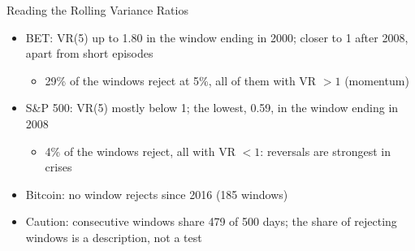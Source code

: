 \begin{frame}{Reading the Rolling Variance Ratios}
\itemsize{\small}
\begin{itemize}
    \item BET: VR(5) up to 1.80 in the window ending in 2000; closer to 1 after 2008, apart from short episodes
    \begin{itemize}
        \item 29\% of the windows reject at 5\%, all of them with VR $> 1$ (momentum)
    \end{itemize}
    \item S\&P 500: VR(5) mostly below 1; the lowest, 0.59, in the window ending in 2008
    \begin{itemize}
        \item 4\% of the windows reject, all with VR $< 1$: reversals are strongest in crises
    \end{itemize}
    \item Bitcoin: no window rejects since 2016 (185 windows)
    \item Caution: consecutive windows share 479 of 500 days; the share of rejecting windows is a description, not a test
\end{itemize}
\end{frame}

